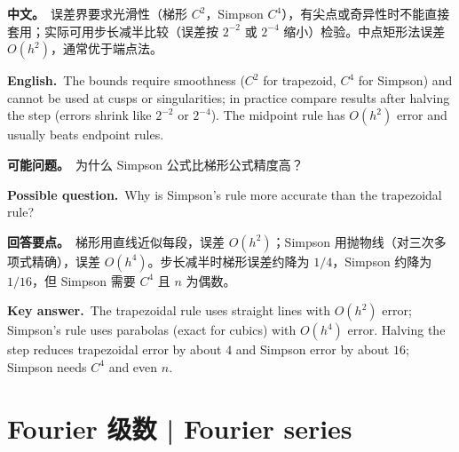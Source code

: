\documentclass[UTF8,11pt,a4paper]{ctexart}
\newcommand{\BOTH}[2]{\par\noindent\textbf{中文。}\ #1\par\noindent\textbf{English.}\ #2\par}
\newcommand{\ASK}[4]{\begin{samepage}\par\noindent\textbf{可能问题。}\ #1\par\noindent\textbf{Possible question.}\ #2\par\noindent\textbf{回答要点。}\ #3\par\noindent\textbf{Key answer.}\ #4\medskip\end{samepage}}
\begin{document}
\BOTH{误差界要求光滑性（梯形 $C^2$，Simpson $C^4$），有尖点或奇异性时不能直接套用；实际可用步长减半比较（误差按 $2^{-2}$ 或 $2^{-4}$ 缩小）检验。中点矩形法误差 $O(h^2)$，通常优于端点法。}{The bounds require smoothness ($C^2$ for trapezoid, $C^4$ for Simpson) and cannot be used at cusps or singularities; in practice compare results after halving the step (errors shrink like $2^{-2}$ or $2^{-4}$). The midpoint rule has $O(h^2)$ error and usually beats endpoint rules.}
\ASK{为什么 Simpson 公式比梯形公式精度高？}{Why is Simpson's rule more accurate than the trapezoidal rule?}{梯形用直线近似每段，误差 $O(h^2)$；Simpson 用抛物线（对三次多项式精确），误差 $O(h^4)$。步长减半时梯形误差约降为 $1/4$，Simpson 约降为 $1/16$，但 Simpson 需要 $C^4$ 且 $n$ 为偶数。}{The trapezoidal rule uses straight lines with $O(h^2)$ error; Simpson's rule uses parabolas (exact for cubics) with $O(h^4)$ error. Halving the step reduces trapezoidal error by about $4$ and Simpson error by about $16$; Simpson needs $C^4$ and even $n$.}

\setcounter{section}{15}
\section{Fourier 级数 | Fourier series}
\end{document}
